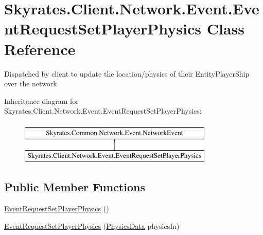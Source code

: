 \hypertarget{class_skyrates_1_1_client_1_1_network_1_1_event_1_1_event_request_set_player_physics}{\section{Skyrates.\-Client.\-Network.\-Event.\-Event\-Request\-Set\-Player\-Physics Class Reference}
\label{class_skyrates_1_1_client_1_1_network_1_1_event_1_1_event_request_set_player_physics}
}


Dispatched by client to update the location/physics of their Entity\-Player\-Ship over the network  


Inheritance diagram for Skyrates.\-Client.\-Network.\-Event.\-Event\-Request\-Set\-Player\-Physics\-:\begin{figure}[H]
\begin{center}
\leavevmode
\includegraphics[height=2.000000cm]{class_skyrates_1_1_client_1_1_network_1_1_event_1_1_event_request_set_player_physics}
\end{center}
\end{figure}
\subsection*{Public Member Functions}
\begin{DoxyCompactItemize}
\item 
\hyperlink{class_skyrates_1_1_client_1_1_network_1_1_event_1_1_event_request_set_player_physics_abd684e9d55023aac4d0c0e0039e7773d}{Event\-Request\-Set\-Player\-Physics} ()
\item 
\hyperlink{class_skyrates_1_1_client_1_1_network_1_1_event_1_1_event_request_set_player_physics_af7b51739e0eeadc934a17a3316b4b103}{Event\-Request\-Set\-Player\-Physics} (\hyperlink{class_skyrates_1_1_common_1_1_a_i_1_1_physics_data}{Physics\-Data} physics\-In)
\end{DoxyCompactItemize}
